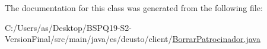 The documentation for this class was generated from the following file\+:\begin{DoxyCompactItemize}
\item 
C\+:/\+Users/as/\+Desktop/\+B\+S\+P\+Q19-\/\+S2-\/\+Version\+Final/src/main/java/es/deusto/client/\mbox{\hyperlink{_borrar_patrocinador_8java}{Borrar\+Patrocinador.\+java}}\end{DoxyCompactItemize}

